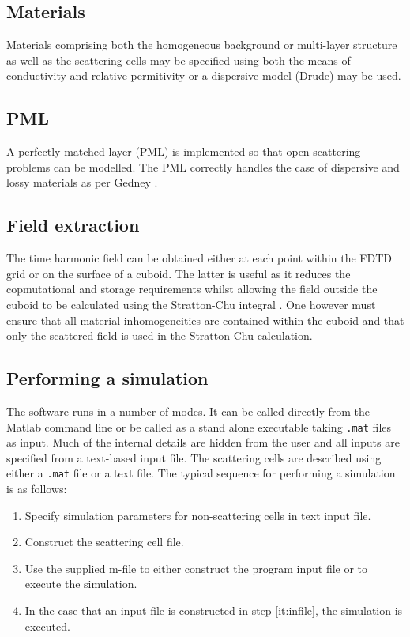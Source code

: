 \documentclass[a4paper, 12pt]{article}
\begin{document}
	\subsection{Materials}
	Materials comprising both the homogeneous background or multi-layer
	structure as well as the scattering cells may be specified using
	both the means of conductivity and relative permitivity or a
	dispersive model (Drude) may be used. 
	
	\subsection{PML}
	A perfectly matched layer (PML) is implemented so that open scattering
	problems can be modelled. The PML correctly handles the case of
	dispersive and lossy materials as per Gedney
	\cite{gedney96electromagnetics399,gedney96ieeetransantprop1630}.
	
	\subsection{Field extraction}
	The time harmonic field can be obtained either at each point within
	the FDTD grid or on the surface of a cuboid. The latter is useful as
	it reduces the copmutational and storage requirements whilst allowing
	the field outside the cuboid to be calculated using the Stratton-Chu
	integral \cite{poggio73book,stratton39pr99}. One however must ensure
	that all material inhomogeneities are contained within the cuboid and
	that only the scattered field is used in the Stratton-Chu calculation.
	
	
	\subsection{Performing a simulation}
	The software runs in a number of modes. It can be called directly from
	the Matlab command line or be called as a stand alone executable
	taking \verb+.mat+ files as input. Much of the internal details are
	hidden from the user and all inputs are specified from a text-based
	input file. The scattering cells are described using either a
	\verb+.mat+ file or a text file. The typical sequence for performing a
	simulation is as follows:
	\begin{enumerate}
		\item Specify simulation parameters for non-scattering cells in text
		input file.
		\item Construct the scattering cell file.
		\item Use the supplied m-file to either construct the program input
		file or to execute the simulation.\label{it:infile}
		\item In the case that an input file is constructed in step
		\ref{it:infile}, the simulation is executed.
	\end{enumerate}
\end{document}
